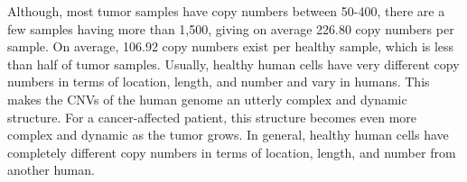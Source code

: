 \hspace*{3.5mm} Although, most tumor samples have copy numbers between 50-400, there are a few samples having more than 1,500, giving on average 226.80 copy numbers per sample. On average, 106.92 copy numbers exist per healthy sample, which is less than half of tumor samples. Usually, healthy human cells have very different copy numbers in terms of location, length, and number and vary in humans. This makes the CNVs of the human genome an utterly complex and dynamic structure. For a cancer-affected patient, this structure becomes even more complex and dynamic as the tumor grows. In general, healthy human cells have completely different copy numbers in terms of location, length, and number from another human. 

